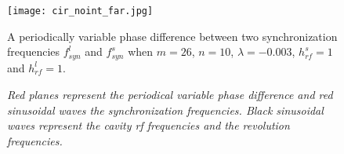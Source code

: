 \begin{figure}[!htb]
   \centering   
   \texttt{[image: cir\_noint\_far.jpg]}
   \caption{A periodically variable phase difference between two synchronization frequencies $f_{\mathit{syn}}^{l}$ and $f_{\mathit{syn}}^{s}$ when $m=26$, $n=10$, $\lambda=-0.003$, $h^s_\mathit{rf}=1$ and $h^l_\mathit{rf}=1$.}
	\caption*{\textsl{\small{Red planes represent the periodical variable phase difference and red sinusoidal waves the synchronization frequencies. Black sinusoidal waves represent the cavity rf frequencies and the revolution frequencies.}}}
   \label{cir_noint_far}
\end{figure} 





%

  
